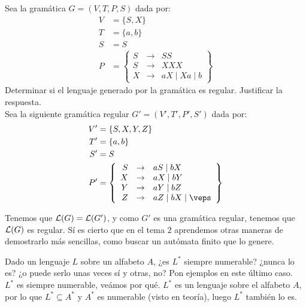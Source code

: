 \begin{ejercicio}
    Sea la gramática $G=\left(V,T,P,S\right)$ dada por:
    \begin{align*}
        V &= \{S, X\} \\
        T &= \{a,b\} \\
        S &= S\\
        P &= \left\{
            \begin{array}{rcl}
                S &\rightarrow & SS \\
                S &\rightarrow & XXX \\
                X &\rightarrow & aX \mid Xa \mid b
            \end{array}
        \right\}
    \end{align*}
    Determinar si el lenguaje generado por la gramática es regular. Justificar la respuesta.\\

    Sea la siguiente gramática regular $G'=\left(V',T',P',S'\right)$ dada por:
    \begin{align*}
        V' &= \{S, X,Y,Z\} \\
        T' &= \{a,b\} \\
        S' &= S \\
        P' &= \left\{
            \begin{array}{rcl}
                S &\rightarrow & aS \mid bX \\
                X &\rightarrow & aX \mid bY \\
                Y &\rightarrow & aY \mid bZ \\
                Z &\rightarrow & aZ \mid bX \mid \veps
            \end{array}
        \right\}
    \end{align*}

    Tenemos que $\mathcal{L}(G) = \mathcal{L}(G')$, y como $G'$ es una gramática regular, tenemos que $\mathcal{L}(G)$ es regular.
    Sí es cierto que en el tema $2$ aprendemos otras maneras de demostrarlo más sencillas, como buscar un autómata finito que lo genere.
\end{ejercicio}

\begin{ejercicio}
    Dado un lenguaje $L$ sobre un alfabeto $A$, ¿es $L^{\ast}$ siempre numerable? ¿nunca lo es? ¿o puede serlo unas veces sí y otras, no? Pon ejemplos en este último caso.\\

    $L^{\ast}$ es siempre numerable, veámos por qué. $L^{\ast}$ es un lenguaje sobre el alfabeto $A$, por lo que $L^{\ast}\subseteq A^{\ast}$ y $A^{\ast}$ es numerable (visto en teoría), luego $L^{\ast}$ también lo es.
\end{ejercicio}

